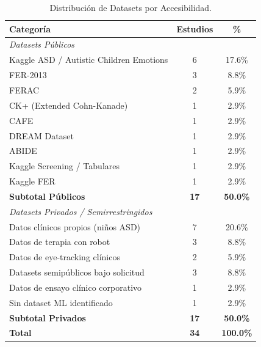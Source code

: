 \documentclass[3p,twocolumn,times]{elsarticle}
\begin{document}
	\begin{table}[!ht]
		\centering
		\caption{Distribución de Datasets por Accesibilidad.}\label{tab10}
		\begin{tabular}{p{3.2cm}cc}
			\toprule
			\textbf{Categoría} & \textbf{Estudios} & \textbf{\%} \\
			\midrule
			\multicolumn{3}{l}{\textit{Datasets Públicos}} \\
			Kaggle ASD / Autistic Children Emotions & 6  & 17.6\% \\
			FER-2013                                & 3  & 8.8\%  \\
			FERAC                                   & 2  & 5.9\%  \\
			CK+ (Extended Cohn-Kanade)              & 1  & 2.9\%  \\
			CAFE                                    & 1  & 2.9\%  \\
			DREAM Dataset                           & 1  & 2.9\%  \\
			ABIDE                                   & 1  & 2.9\%  \\
			Kaggle Screening / Tabulares            & 1  & 2.9\%  \\
			Kaggle FER                              & 1  & 2.9\%  \\
			\textbf{Subtotal Públicos}              & \textbf{17} & \textbf{50.0\%} \\
			\midrule
			\multicolumn{3}{l}{\textit{Datasets Privados / Semirrestringidos}} \\
			Datos clínicos propios (niños ASD)      & 7  & 20.6\% \\
			Datos de terapia con robot              & 3  & 8.8\%  \\
			Datos de eye-tracking clínicos          & 2  & 5.9\%  \\
			Datasets semipúblicos bajo solicitud    & 3  & 8.8\%  \\
			Datos de ensayo clínico corporativo     & 1  & 2.9\%  \\
			Sin dataset ML identificado             & 1  & 2.9\%  \\
			\textbf{Subtotal Privados}              & \textbf{17} & \textbf{50.0\%} \\
			\midrule
			\textbf{Total}                          & \textbf{34} & \textbf{100.0\%} \\
			\bottomrule
		\end{tabular}
		\begin{minipage}{\columnwidth}
			\vspace{6pt}

\end{minipage}
\end{table}
\end{document}
